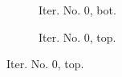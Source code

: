 \documentclass[a4paper,12pt]{amsart}
\numberwithin{equation}{section}
\begin{document}
\begin{figure}[h!]
\centering
\begin{subfigure}[t]{0.49\textwidth}
    \caption{Iter. No. 0, bot.}
\end{subfigure}
	\hfill
\begin{subfigure}[t]{0.49\textwidth}
    \caption{Iter. No. 0, top.}
\end{subfigure}


\end{figure}
\end{document}
